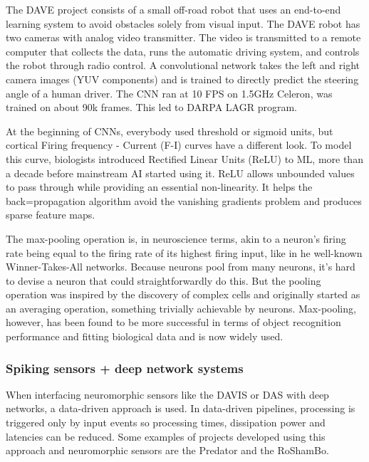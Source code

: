 \documentclass[main]{subfiles}
\begin{document}
The DAVE project consists of a small off-road robot that uses an end-to-end learning system to avoid obstacles solely from visual input. The DAVE robot has two cameras with analog video transmitter. The video is transmitted to a remote computer that collects the data, runs the automatic driving system, and controls the robot through radio control. A convolutional network takes the left and right camera images (YUV components) and is trained to directly predict the steering angle of a human driver. The CNN ran at 10 FPS on 1.5GHz Celeron, was trained on about 90k frames. This led to DARPA LAGR program.

At the beginning of CNNs, everybody used threshold or sigmoid units, but cortical Firing frequency - Current (F-I) curves have a different look. To model this curve, biologists introduced Rectified Linear Units (ReLU) to ML, more than a decade before mainstream AI started using it. ReLU allows unbounded values to pass through while providing an essential non-linearity. It helps the back=propagation algorithm avoid the vanishing gradients problem and produces sparse feature maps.

The max-pooling operation is, in neuroscience terms, akin to a neuron’s firing rate being equal to the firing rate of its highest firing input, like in he well-known Winner-Takes-All networks. Because neurons pool from many neurons, it’s hard to devise a neuron that could straightforwardly do this. But the pooling operation was inspired by the discovery of complex cells and originally started as an averaging operation, something trivially achievable by neurons. Max-pooling, however, has been found to be more successful in terms of object recognition performance and fitting biological data and is now widely used. 


\subsubsection{Spiking sensors + deep network systems}

When interfacing neuromorphic sensors like the DAVIS or DAS with deep networks, a data-driven approach is used. In data-driven pipelines, processing is triggered only by input events so processing times, dissipation power and latencies can be reduced. Some examples of projects developed using this approach and neuromorphic sensors are the Predator and the RoShamBo.
\end{document}

